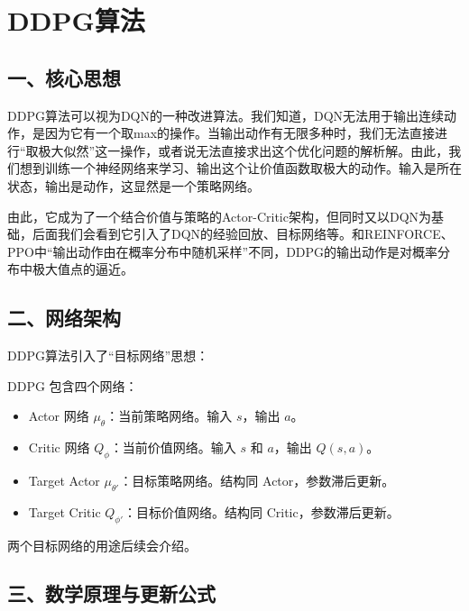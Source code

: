 \setcounter{section}{4}

\hypertarget{ddpgux7b97ux6cd5}{%
\section{DDPG算法}\label{ddpgux7b97ux6cd5}}

\hypertarget{ux4e00ux6838ux5fc3ux601dux60f3-3}{%
\subsection{一、核心思想}\label{ux4e00ux6838ux5fc3ux601dux60f3-3}}

DDPG算法可以视为DQN的一种改进算法。我们知道，DQN无法用于输出连续动作，是因为它有一个取max的操作。当输出动作有无限多种时，我们无法直接进行``取极大似然''这一操作，或者说无法直接求出这个优化问题的解析解。由此，我们想到训练一个神经网络来学习、输出这个让价值函数取极大的动作。输入是所在状态，输出是动作，这显然是一个策略网络。

由此，它成为了一个结合价值与策略的Actor-Critic架构，但同时又以DQN为基础，后面我们会看到它引入了DQN的经验回放、目标网络等。和REINFORCE、PPO中``输出动作由在概率分布中随机采样''不同，DDPG的输出动作是对概率分布中极大值点的逼近。

\hypertarget{ux4e8cux7f51ux7edcux67b6ux6784}{%
\subsection{二、网络架构}\label{ux4e8cux7f51ux7edcux67b6ux6784}}

DDPG算法引入了``目标网络''思想：

DDPG 包含四个网络：

\begin{itemize}
\tightlist
\item
  Actor 网络 \(\mu_\theta\)：当前策略网络。输入 \(s\)，输出 \(a\)。
\item
  Critic 网络 \(Q_\phi\)：当前价值网络。输入 \(s\) 和 \(a\)，输出 \(Q(s,a)\)。
\item
  Target Actor \(\mu_{\theta'}\)：目标策略网络。结构同 Actor，参数滞后更新。
\item
  Target Critic \(Q_{\phi'}\)：目标价值网络。结构同 Critic，参数滞后更新。
\end{itemize}

两个目标网络的用途后续会介绍。

\hypertarget{ux4e09ux6570ux5b66ux539fux7406ux4e0eux66f4ux65b0ux516cux5f0f}{%
\subsection{三、数学原理与更新公式}\label{ux4e09ux6570ux5b66ux539fux7406ux4e0eux66f4ux65b0ux516cux5f0f}}


